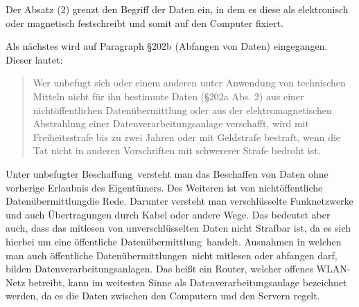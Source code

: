 \documentclass[10pt,a4paper]{article}
\begin{document}
Der Absatz (2) grenzt den Begriff der Daten ein, in dem es diese als elektronisch oder magnetisch festschreibt und somit auf den Computer fixiert. 


Als nächstes wird auf Paragraph §202b (Abfangen von Daten) eingegangen. Dieser lautet:
\begin{quote}
Wer unbefugt sich oder einem anderen unter Anwendung von technischen Mitteln nicht für ihn bestimmte Daten (§202a Abs. 2) aus einer nichtöffentlichen Datenübermittlung oder aus der elektromagnetischen Abstrahlung einer Datenverarbeitungsanlage verschafft, wird mit Freiheitsstrafe bis zu zwei Jahren oder mit Geldstrafe bestraft, wenn die Tat nicht in anderen Vorschriften mit schwererer Strafe bedroht ist.
\end{quote}
Unter \glqq unbefugter Beschaffung\grqq \ versteht man das Beschaffen von Daten ohne vorherige Erlaubnis des Eigentümers. Des Weiteren ist von \glqq nichtöffentliche Datenübermittlung\grqq die Rede. Darunter versteht man verschlüsselte Funknetzwerke und auch Übertragungen durch Kabel oder andere Wege. Das bedeutet aber auch, dass das mitlesen von unverschlüsselten Daten nicht Strafbar ist, da es sich hierbei um eine \glqq öffentliche Datenübermittlung\grqq \ handelt. Ausnahmen in welchen man auch \glqq öffentliche Datenübermittlungen\grqq \  nicht mitlesen oder abfangen darf, bilden Datenverarbeitungsanlagen. Das heißt ein Router, welcher offenes WLAN-Netz betreibt, kann im weitesten Sinne als Datenverarbeitungsanlage bezeichnet werden, da es die Daten zwischen den Computern und den Servern regelt.
\end{document}
